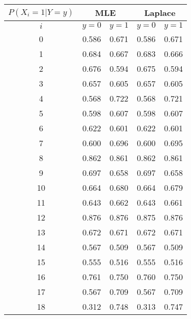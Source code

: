\documentclass{article}
\begin{document}
\begin{enumerate}
\begin{enumerate}
		
		\begin{tabular}{|c|c|c|c|c|}
			\hline
			$P(X_i = 1 | Y = y)$ & \multicolumn{2}{|c|}{MLE} & \multicolumn{2}{|c|}{Laplace}\\
			\hline
			$i$&$y = 0$ &$y = 1$&$y = 0$&$y = 1$\\
			\hline
			\hline
			0 & 0.586 & 0.671 & 0.586 & 0.671 \\
			1 & 0.684 & 0.667 & 0.683 & 0.666 \\
			2 & 0.676 & 0.594 & 0.675 & 0.594 \\
			3 & 0.657 & 0.605 & 0.657 & 0.605 \\
			4 & 0.568 & 0.722 & 0.568 & 0.721 \\
			5 & 0.598 & 0.607 & 0.598 & 0.607 \\
			6 & 0.622 & 0.601 & 0.622 & 0.601 \\
			7 & 0.600 & 0.696 & 0.600 & 0.695 \\
			8 & 0.862 & 0.861 & 0.862 & 0.861 \\
			9 & 0.697 & 0.658 & 0.697 & 0.658 \\
			10 & 0.664 & 0.680 & 0.664 & 0.679 \\
			11 & 0.643 & 0.662 & 0.643 & 0.661 \\
			12 & 0.876 & 0.876 & 0.875 & 0.876 \\
			13 & 0.672 & 0.671 & 0.672 & 0.671 \\
			14 & 0.567 & 0.509 & 0.567 & 0.509 \\
			15 & 0.555 & 0.516 & 0.555 & 0.516 \\
			16 & 0.761 & 0.750 & 0.760 & 0.750 \\
			17 & 0.567 & 0.709 & 0.567 & 0.709 \\
			18 & 0.312 & 0.748 & 0.313 & 0.747 \\
			\hline
			

\end{tabular}
\end{enumerate}
\end{enumerate}
\end{document}
